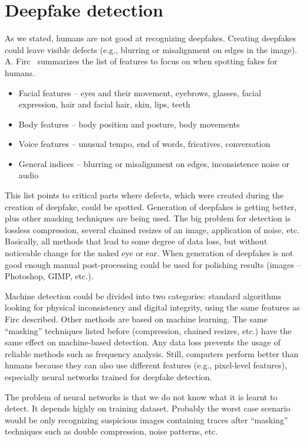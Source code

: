 \chapter{Deepfake detection}
\label{chapter:deepfake_detectoin}

As we stated, humans are not good at recognizing deepfakes. Creating deepfakes could leave visible defects (e.g., blurring or misalignment on edges in the image). A. Firc~\cite{ApplicabilityOfDeepfakes} summarizes the list of features to focus on when spotting fakes for humans.

\begin{itemize}
    \item Facial features – eyes and their movement, eyebrows, glasses, facial expression, hair and facial hair, skin, lips, teeth
    \item Body features – body position and posture, body movements
    \item Voice features – unusual tempo, end of words, fricatives, conversation
    \item General indices – blurring or misalignment on edges, inconsistence noise or audio
\end{itemize}
	
This list points to critical parts where defects, which were created during the creation of deepfake, could be spotted. Generation of deepfakes is getting better, plus other masking techniques are being used. The big problem for detection is lossless compression, several chained resizes of an image, application of noise, etc. Basically, all methods that lead to some degree of data loss, but without noticeable change for the naked eye or ear. When generation of deepfakes is not good enough manual post-processing could be used for polishing results (images – Photoshop, GIMP, etc.). 

Machine detection could be divided into two categories: standard algorithms looking for physical inconsistency and digital integrity, using the same features as Firc described. Other methods are based on machine learning. The same “masking” techniques listed before (compression, chained resizes, etc.) have the same effect on machine-based detection. Any data loss prevents the usage of reliable methods such as frequency analysis. Still, computers perform better than humans because they can also use different features (e.g., pixel-level features), especially neural networks trained for deepfake detection.~\cite{MediaForensicsandDeepFakes}

The problem of neural networks is that we do not know what it is learnt to detect. It depends highly on training dataset. Probably the worst case scenario would be only recognizing suspicious images containing traces after “masking” techniques such as double compression, noise patterns, etc.

